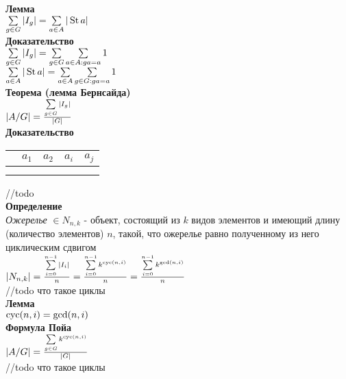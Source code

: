 \documentclass[12pt]{article}
\begin{document}
\textbf{Лемма}\\
$\sum\limits_{g\in G} |I_g| = \sum\limits_{a \in A} |\operatorname{St} a|$\\
\textbf{Доказательство}\\
$\sum\limits_{g\in G} |I_g| = \sum\limits_{g \in G} \sum\limits_{a \in A: ga = a} 1$\\
$\sum\limits_{a \in A} |\operatorname{St} a| = \sum\limits_{a \in A} \sum\limits_{g \in G: ga = a} 1$\\
\textbf{Теорема (лемма Бернсайда)}\\
$|A/G| = \frac{\sum\limits_{g\in G} |I_g|}{|G|}$\\
\textbf{Доказательство}\\
\begin{tabular}{c|c c c c}
    & $a_1$ & $a_2$ & $a_i$ & $a_j$\\
    \hline
    &  \\
    & 
\end{tabular}
//todo\\
\textbf{Определение}\\
\textit{Ожерелье} $\in N_{n,k}$ - объект, состоящий из $k$ видов элементов и имеющий длину (количество элементов) $n$, такой, что ожерелье равно полученному из него циклическим сдвигом\\
$|N_{n,k}| = \frac{\sum\limits_{i = 0}^{n-1} |I_i|}{n} = \frac{\sum\limits_{i = 0}^{n-1} k^{\operatorname{cyc}(n,i)}}{n} = \frac{\sum\limits_{i = 0}^{n-1} k^{\operatorname{gcd}(n,i)}}{n}$\\
//todo что такое циклы\\
\textbf{Лемма}\\
$\operatorname{cyc}(n,i) = \operatorname{gcd}(n,i)$\\
\textbf{Формула Пойа}\\
$|A/G| = \frac{\sum\limits_{g \in G} k^{\operatorname{cyc}(n,i)}}{|G|}$\\
//todo что такое циклы\\
\end{document}
